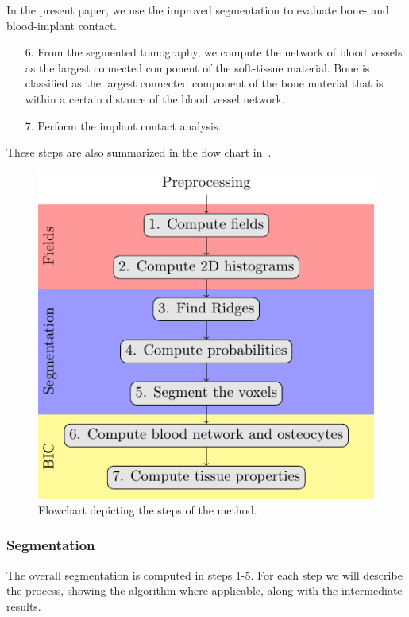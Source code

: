 %
In the present paper, we use the improved segmentation to evaluate bone- and
blood-implant contact.
\begin{enumerate}
    \item[6.] From the segmented tomography, we compute the network of blood
        vessels as the largest connected component of the soft-tissue material.
        Bone is classified as the largest connected component of the bone
        material that is within a certain distance of the blood vessel network.

    \item[7.] Perform the implant contact analysis.
\end{enumerate}
%
These steps are also summarized in the flow chart in~.

\begin{figure}
  \centering
  \includegraphics{steps}
    \caption{Flowchart depicting the steps of the method.}
    \label{fig:flowchart}
\end{figure}

\subsubsection{Segmentation}
The overall segmentation is computed in steps 1-5. For each step we will
describe the process, showing the algorithm where applicable, along with the
intermediate results.

